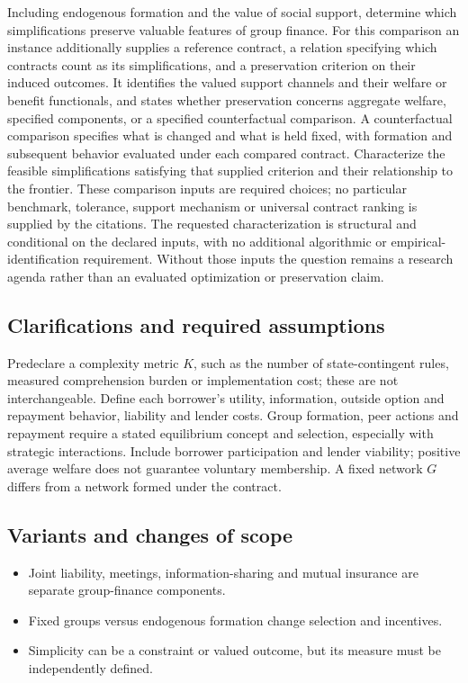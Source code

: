 \documentclass[11pt,a4paper]{article}
\begin{document}
Including endogenous formation and the value of social support, determine which simplifications preserve valuable features of group finance. For this comparison an instance additionally supplies a reference contract, a relation specifying which contracts count as its simplifications, and a preservation criterion on their induced outcomes. It identifies the valued support channels and their welfare or benefit functionals, and states whether preservation concerns aggregate welfare, specified components, or a specified counterfactual comparison. A counterfactual comparison specifies what is changed and what is held fixed, with formation and subsequent behavior evaluated under each compared contract. Characterize the feasible simplifications satisfying that supplied criterion and their relationship to the frontier. These comparison inputs are required choices; no particular benchmark, tolerance, support mechanism or universal contract ranking is supplied by the citations. The requested characterization is structural and conditional on the declared inputs, with no additional algorithmic or empirical-identification requirement. Without those inputs the question remains a research agenda rather than an evaluated optimization or preservation claim.

\subsection*{Clarifications and required assumptions}

Predeclare a complexity metric \(K\), such as the number of state-contingent rules, measured comprehension burden or implementation cost; these are not interchangeable. Define each borrower's utility, information, outside option and repayment behavior, liability and lender costs. Group formation, peer actions and repayment require a stated equilibrium concept and selection, especially with strategic interactions. Include borrower participation and lender viability; positive average welfare does not guarantee voluntary membership. A fixed network \(G\) differs from a network formed under the contract.

\subsection*{Variants and changes of scope}

\begin{itemize}
\item Joint liability, meetings, information-sharing and mutual insurance are separate group-finance components.
\item Fixed groups versus endogenous formation change selection and incentives.
\item Simplicity can be a constraint or valued outcome, but its measure must be independently defined.
\end{itemize}
\end{document}
